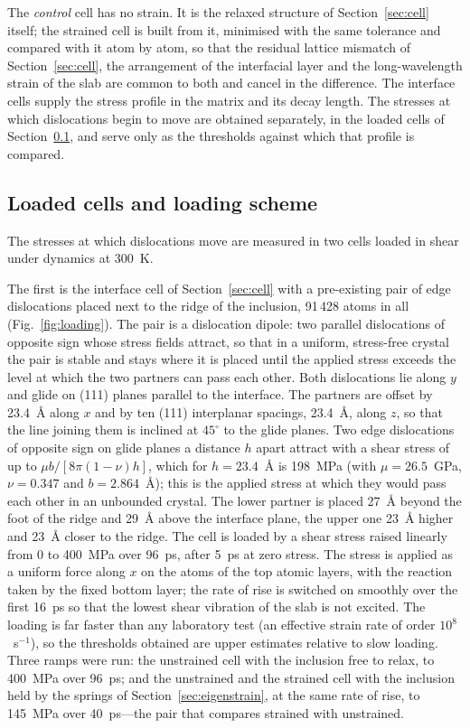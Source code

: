 The \emph{control} cell has no strain. It is the relaxed structure of
Section~\ref{sec:cell} itself; the strained cell is built from it, minimised
with the same tolerance and compared with it atom by atom, so that the
residual lattice mismatch of Section~\ref{sec:cell}, the arrangement of the
interfacial layer and the long-wavelength strain of the slab are common to
both and cancel in the difference. The interface cells supply the stress profile in the
matrix and its decay length. The stresses at which dislocations begin to move
are obtained separately, in the loaded cells of Section~\ref{sec:loading},
and serve only as the thresholds against which that profile is compared.

\subsection{Loaded cells and loading scheme}
\label{sec:loading}

The stresses at which dislocations move are measured in two cells loaded in
shear under dynamics at 300~K.

The first is the interface cell of Section~\ref{sec:cell} with a
pre-existing pair of edge dislocations placed next to the ridge of the
inclusion, 91\,428 atoms in all (Fig.~\ref{fig:loading}). The pair is
a dislocation dipole: two parallel dislocations of opposite sign whose stress
fields attract, so that in a uniform, stress-free crystal the pair is stable and stays where it is placed until
the applied stress exceeds the level at which the two partners can pass each
other. Both dislocations lie along $y$ and glide on (111) planes parallel to
the interface. The partners are offset by 23.4~\AA{} along $x$ and by ten
(111) interplanar spacings, 23.4~\AA{}, along $z$, so that the line joining
them is inclined at $45^{\circ}$ to the glide planes. Two edge dislocations
of opposite sign on glide planes a distance $h$ apart attract with a shear
stress of up to $\mu b/[8\pi(1-\nu)h]$, which for $h=23.4$~\AA{} is 198~MPa
(with $\mu=26.5$~GPa, $\nu=0.347$ and $b=2.864$~\AA{}); this is the applied
stress at which they would pass each other in an unbounded crystal. The lower
partner is placed 27~\AA{} beyond the foot of the ridge and 29~\AA{} above the
interface plane, the upper one 23~\AA{} higher and 23~\AA{} closer to the
ridge. The cell is loaded by a shear stress raised
linearly from 0 to 400~MPa over 96~ps, after 5~ps at zero stress. The stress
is applied as a uniform force along $x$ on the atoms of the top atomic
layers, with the reaction taken by the fixed bottom layer; the rate of rise
is switched on smoothly over the first 16~ps so that the lowest shear
vibration of the slab is not excited. The loading is far faster than any
laboratory test (an effective strain rate of order $10^{8}$~s$^{-1}$), so the
thresholds obtained are upper estimates relative to slow loading. Three ramps were run: the unstrained cell with the inclusion free to relax,
to 400~MPa over 96~ps; and the unstrained and the strained cell with the
inclusion held by the springs of Section~\ref{sec:eigenstrain}, at the same
rate of rise, to 145~MPa over 40~ps---the pair that compares strained with
unstrained.

